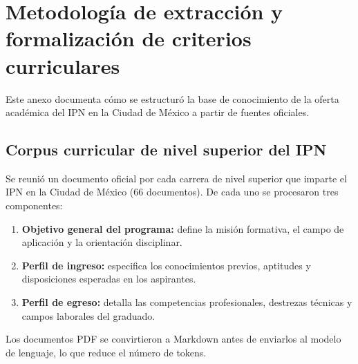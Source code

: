 \chapter{Metodología de extracción y formalización de criterios curriculares}\label{anexo:extraccion}

Este anexo documenta cómo se estructuró la base de conocimiento de la oferta académica del IPN en la Ciudad de México a partir de fuentes oficiales.

\section{Corpus curricular de nivel superior del IPN}
Se reunió un documento oficial por cada carrera de nivel superior que imparte el IPN en la Ciudad de México (66 documentos). De cada uno se procesaron tres componentes:
\begin{enumerate}
    \item \textbf{Objetivo general del programa:} define la misión formativa, el campo de aplicación y la orientación disciplinar.
    \item \textbf{Perfil de ingreso:} especifica los conocimientos previos, aptitudes y disposiciones esperadas en los aspirantes.
    \item \textbf{Perfil de egreso:} detalla las competencias profesionales, destrezas técnicas y campos laborales del graduado.
\end{enumerate}
Los documentos PDF se convirtieron a Markdown antes de enviarlos al modelo de lenguaje, lo que reduce el número de tokens.

